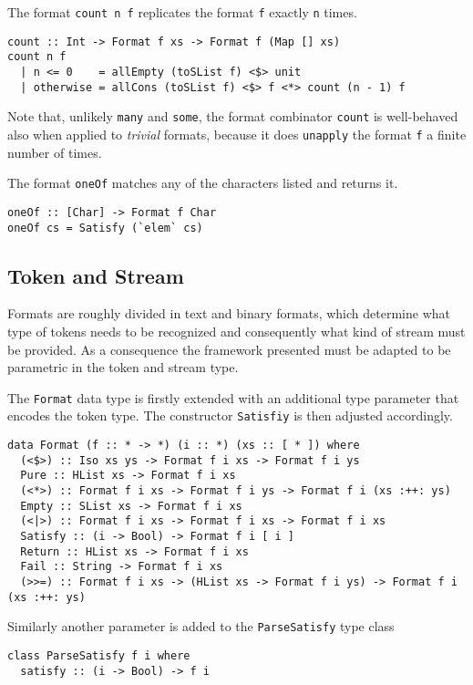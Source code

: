 \documentclass[../Thesis.tex]{subfiles}
\begin{document}
The format \texttt{count n f} replicates the format \texttt{f} exactly \texttt{n} times.
\begin{verbatim}
count :: Int -> Format f xs -> Format f (Map [] xs)
count n f
  | n <= 0    = allEmpty (toSList f) <$> unit
  | otherwise = allCons (toSList f) <$> f <*> count (n - 1) f
\end{verbatim}

Note that, unlikely \texttt{many} and \texttt{some}, the format combinator 
\texttt{count} is well-behaved also when applied to \emph{trivial} formats, 
because it does \texttt{unapply} the format \texttt{f} a finite number of times.

The format \texttt{oneOf} matches any of the characters listed and returns it.

\begin{verbatim}
oneOf :: [Char] -> Format f Char
oneOf cs = Satisfy (`elem` cs) 
\end{verbatim}

\subsection{Token and Stream}
\label{subsec:TokenAndStream}
Formats are roughly divided in text and binary formats, which determine what type of tokens needs to be recognized and consequently what kind of stream 
must be provided. As a consequence the framework presented must be adapted to be parametric in the token and stream type.

The \texttt{Format} data type is firstly extended with an additional type parameter that encodes the token type. The constructor \texttt{Satisfiy} is then
adjusted accordingly.

\begin{verbatim}
data Format (f :: * -> *) (i :: *) (xs :: [ * ]) where
  (<$>) :: Iso xs ys -> Format f i xs -> Format f i ys
  Pure :: HList xs -> Format f i xs
  (<*>) :: Format f i xs -> Format f i ys -> Format f i (xs :++: ys)
  Empty :: SList xs -> Format f i xs
  (<|>) :: Format f i xs -> Format f i xs -> Format f i xs
  Satisfy :: (i -> Bool) -> Format f i [ i ]
  Return :: HList xs -> Format f i xs
  Fail :: String -> Format f i xs
  (>>=) :: Format f i xs -> (HList xs -> Format f i ys) -> Format f i (xs :++: ys)
\end{verbatim}

Similarly another parameter is added to the \texttt{ParseSatisfy} type class
\begin{verbatim}
class ParseSatisfy f i where
  satisfy :: (i -> Bool) -> f i
\end{verbatim}
\end{document}
